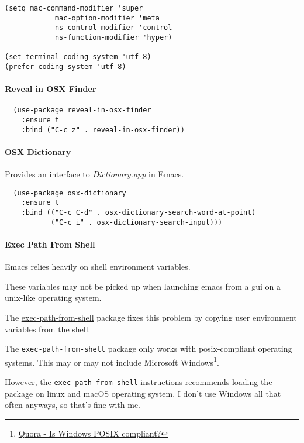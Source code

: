 \documentclass[11pt]{article}
\begin{document}
\begin{verbatim}
(setq mac-command-modifier 'super
            mac-option-modifier 'meta
            ns-control-modifier 'control
            ns-function-modifier 'hyper)

(set-terminal-coding-system 'utf-8)
(prefer-coding-system 'utf-8)
\end{verbatim}

\paragraph*{Reveal in OSX Finder}
\label{sec:org192255f}

\begin{verbatim}
  (use-package reveal-in-osx-finder
    :ensure t
    :bind ("C-c z" . reveal-in-osx-finder))
\end{verbatim}

\paragraph*{OSX Dictionary}
\label{sec:orgff9b12b}

Provides an interface to \emph{Dictionary.app} in Emacs.

\begin{verbatim}
  (use-package osx-dictionary
    :ensure t
    :bind (("C-c C-d" . osx-dictionary-search-word-at-point)
           ("C-c i" . osx-dictionary-search-input)))
\end{verbatim}

\paragraph*{Exec Path From Shell}
\label{sec:orgc53c222}

Emacs relies heavily on shell environment variables.

These variables may not be picked up when launching emacs
from a gui on a unix-like operating system.

The \href{https://github.com/purcell/exec-path-from-shell}{exec-path-from-shell} package fixes this problem by copying
user environment variables from the shell.

The \texttt{exec-path-from-shell} package only works with posix-compliant
operating systems. This may or may not include Microsoft Windows\footnote{\href{https://www.quora.com/Is-Windows-POSIX-compliant}{Quora - Is Windows POSIX compliant?}}.

However, the \texttt{exec-path-from-shell} instructions recommends loading
the package on linux and macOS operating system. I don't use Windows
all that often anyways, so that's fine with me.
\end{document}

